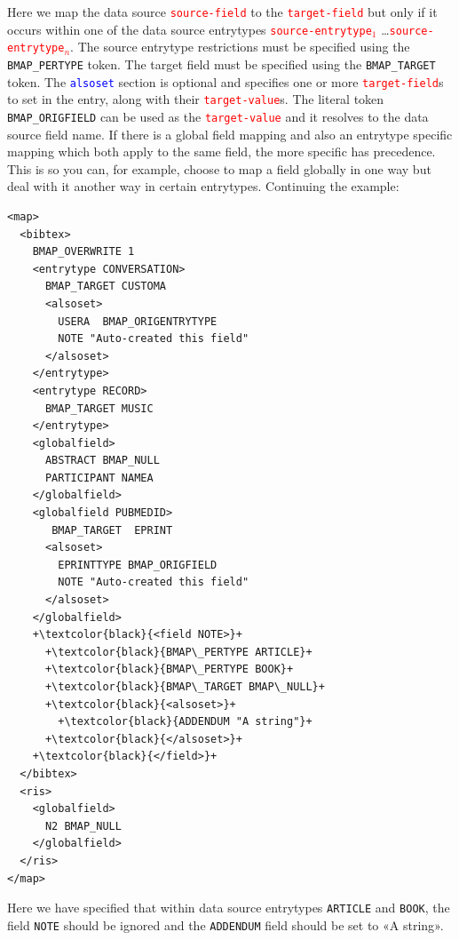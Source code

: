 \documentclass{ltxdockit}
\begin{document}
\noindent Here we map the data source
\textcolor{red}{\texttt{source-field}} to the
\textcolor{red}{\texttt{target-field}} but only if it occurs within one of
the data source entrytypes \textcolor{red}{\texttt{source-entrytype$_1$}}
\ldots\linebreak\textcolor{red}{\texttt{source-entrytype$_n$}}. The source
entrytype restrictions must be specified using the \verb+BMAP_PERTYPE+
token. The target field must be specified using the \verb+BMAP_TARGET+
token. The \textcolor{blue}{\texttt{alsoset}} section is optional and
specifies one or more \textcolor{red}{\texttt{target-field}}s to set in the
entry, along with their \textcolor{red}{\texttt{target-value}}s. The
literal token \verb+BMAP_ORIGFIELD+ can be used as the
\textcolor{red}{\texttt{target-value}} and it resolves to the data source
field name. If there is a global field mapping and also an entrytype
specific mapping which both apply to the same field, the more specific has
precedence. This is so you can, for example, choose to map a field globally
in one way but deal with it another way in certain entrytypes. Continuing
the example: 

{\color{grey}
\lstset{showspaces=false}
\begin{lstlisting}[escapechar=+,mathescape=true]
<map>
  <bibtex>
    BMAP_OVERWRITE 1
    <entrytype CONVERSATION>
      BMAP_TARGET CUSTOMA
      <alsoset>
        USERA  BMAP_ORIGENTRYTYPE
        NOTE "Auto-created this field"
      </alsoset>
    </entrytype>
    <entrytype RECORD>
      BMAP_TARGET MUSIC
    </entrytype>
    <globalfield>
      ABSTRACT BMAP_NULL
      PARTICIPANT NAMEA
    </globalfield>
    <globalfield PUBMEDID>
       BMAP_TARGET  EPRINT
      <alsoset>
        EPRINTTYPE BMAP_ORIGFIELD
        NOTE "Auto-created this field"
      </alsoset>
    </globalfield>
    +\textcolor{black}{<field NOTE>}+
      +\textcolor{black}{BMAP\_PERTYPE ARTICLE}+
      +\textcolor{black}{BMAP\_PERTYPE BOOK}+
      +\textcolor{black}{BMAP\_TARGET BMAP\_NULL}+
      +\textcolor{black}{<alsoset>}+
        +\textcolor{black}{ADDENDUM "A string"}+
      +\textcolor{black}{</alsoset>}+
    +\textcolor{black}{</field>}+
  </bibtex>
  <ris>
    <globalfield>
      N2 BMAP_NULL
    </globalfield>
  </ris>
</map>
\end{lstlisting}
}

\noindent Here we have specified that within data
source entrytypes \verb+ARTICLE+ and \verb+BOOK+, the field \verb+NOTE+
should be ignored and the \verb+ADDENDUM+ field should be set to «A
string».
\end{document}

